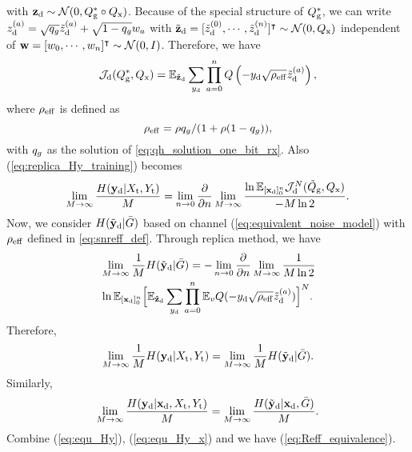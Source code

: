 \documentclass[conference]{IEEEtran}
\begin{document}
with ${\mathbf{z}}_{\rm d}\sim\mathcal{N}(0,Q^*_{\rm g}\circ Q_{\rm x})$. Because of the special structure of $Q^*_{\rm g}$, we can write $z_{\rm d}^{(a)} = \sqrt{q_{ g}}\tilde{z}_{\rm d}^{(a)}+\sqrt{1-q_{ g}}w_a$ with $\tilde{{\mathbf{z}}}_{\rm d}=[\tilde{z}_{\rm d}^{(0)},\cdots,\tilde{z}_{\rm d}^{(n)}]^{\intercal}\sim\mathcal{N}(0,Q_{\rm x})$ independent of ${\mathbf{w}}=[w_0,\cdots,w_n]^{\intercal}\sim\mathcal{N}(0,I)$. Therefore, we have
\begin{align*}
   \mathcal{J}_{\rm d}(Q^*_{\rm g},Q_{\rm x})=\mathbb{E}_{\tilde{{\mathbf{z}}}_{\rm d}}\sum_{y_{\rm d}}\prod_{a=0}^{n}Q\left(-y_{\rm d}\sqrt{\rho_{\rm {eff}}}\tilde{z}_{\rm d}^{(a)}\right),
\end{align*}
where $\rho_{\rm {eff}}$ is defined as
\begin{equation}
    \rho_{\rm {eff}}={\rho q_{ g}}/({1+\rho(1-q_{ g})}),
    \label{eq:snreff_def}
\end{equation}
with $q_{ g}$ as the solution of \eqref{eq:qh_solution_one_bit_rx}. Also (\ref{eq:replica_Hy_training}) becomes
\small 
\begin{equation*}
   \lim_{M\to\infty}\frac{H({\mathbf{y}}_{\rm d}|X_{\rm t},Y_{\rm t})}{M}=\lim_{n\to 0}\frac{\partial}{\partial n}\lim_{M\to\infty}\frac{\ln\mathbb{E}_{[{\mathbf{x}}_{\rm d}]_0^n}\mathcal{J}_{\rm d}^N(\tilde{Q}_{\rm g},Q_{\rm x})}{-M\ln2}. 
\end{equation*}
\normalsize
Now, we consider $H(\tilde{{\mathbf{y}}}_{\rm d}|\bar{G})$ based on channel (\ref{eq:equivalent_noise_model}) with $\rho_{\rm {eff}}$ defined in \eqref{eq:snreff_def}. Through replica method, we have
\begin{align*}
    &\lim_{M\to\infty}\frac{1}{M}H(\tilde{{\mathbf{y}}}_{\rm d}|\bar{G})=-\lim_{n\to 0}\frac{\partial}{\partial n}\lim_{M\to\infty}\frac{1}{M\ln2}\\
    &\ln\mathbb{E}_{[{\mathbf{x}}_{\rm d}]_{0}^{n}}\Big[\mathbb{E}_{\tilde{{\mathbf{z}}}_{\rm d}}\sum_{y_{\rm d}}\prod_{a=0}^{n}\mathbb{E}_{v}Q(-y_{\rm d}\sqrt{\rho_{\rm {eff}}}\tilde{z}_{\rm d}^{(a)})\Big]^N.
\end{align*}
Therefore, 
\begin{equation}
    \lim_{M\to\infty}\frac{1}{M}H({\mathbf{y}}_{\rm d}|X_{\rm t},Y_{\rm t})=\lim_{M\to\infty}\frac{1}{M}H(\tilde{{\mathbf{y}}}_{\rm d}|\bar{G}).
    \label{eq:equ_Hy}
\end{equation}
Similarly,
\begin{equation}
    \lim_{M\to\infty}\frac{H({\mathbf{y}}_{\rm d}|{\mathbf{x}}_{\rm d},X_{\rm t},Y_{\rm t})}{M}=\lim_{M\to\infty}\frac{H(\tilde{{\mathbf{y}}}_{\rm d}|{\mathbf{x}}_{\rm d},\bar{G})}{M}.
    \label{eq:equ_Hy_x}
\end{equation}
Combine (\ref{eq:equ_Hy}), (\ref{eq:equ_Hy_x}) and we have (\ref{eq:Reff_equivalence}).
\end{document}
